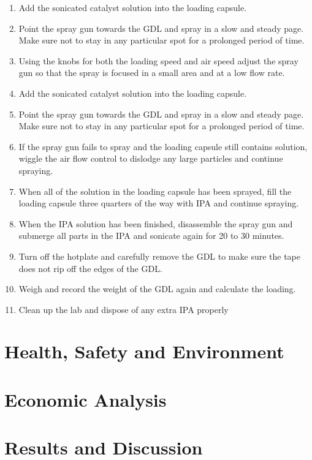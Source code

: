 \documentclass{article}
\begin{document}
\begin{enumerate}
        \item Add the sonicated catalyst solution into the loading capsule.
        \item Point the spray gun towards the GDL and spray in a slow and steady page. Make sure not to stay in any particular spot for a prolonged period of time.
        \item Using the knobs for both the loading speed and air speed adjust the spray gun so that the spray is focused in a small area and at a low flow rate.
        \item Add the sonicated catalyst solution into the loading capsule.
        \item Point the spray gun towards the GDL and spray in a slow and steady page. Make sure not to stay in any particular spot for a prolonged period of time.
        \item If the spray gun fails to spray and the loading capsule still contains solution, wiggle the air flow control to dislodge any large particles and continue spraying.
        \item When all of the solution in the loading capsule has been sprayed, fill the loading capsule three quarters of the way with IPA and continue spraying.
        \item When the IPA solution has been finished, disassemble the spray gun and submerge all parts in the IPA and sonicate again for 20 to 30 minutes.
        \item Turn off the hotplate and carefully remove the GDL to make sure the tape does not rip off the edges of the GDL.
        \item Weigh and record the weight of the GDL again and calculate the loading.
        \item Clean up the lab and dispose of any extra IPA properly
			\end{enumerate}
\pagebreak
\section{Health, Safety and Environment}
\section{Economic Analysis}
\pagebreak
\section{Results and Discussion}
\end{document}
